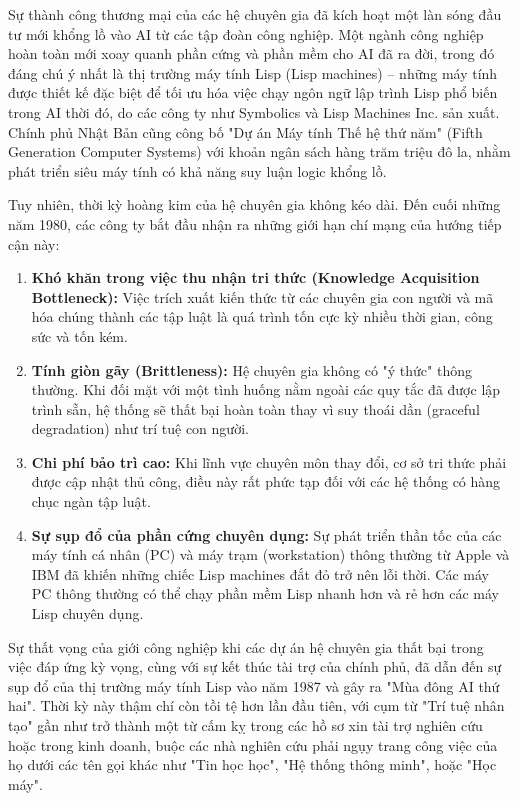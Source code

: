 \documentclass[12pt,a4paper]{article}
\begin{document}
Sự thành công thương mại của các hệ chuyên gia đã kích hoạt một làn sóng đầu tư mới khổng lồ vào AI từ các tập đoàn công nghiệp. Một ngành công nghiệp hoàn toàn mới xoay quanh phần cứng và phần mềm cho AI đã ra đời, trong đó đáng chú ý nhất là thị trường máy tính Lisp (Lisp machines) – những máy tính được thiết kế đặc biệt để tối ưu hóa việc chạy ngôn ngữ lập trình Lisp phổ biến trong AI thời đó, do các công ty như Symbolics và Lisp Machines Inc. sản xuất. Chính phủ Nhật Bản cũng công bố "Dự án Máy tính Thế hệ thứ năm" (Fifth Generation Computer Systems) với khoản ngân sách hàng trăm triệu đô la, nhằm phát triển siêu máy tính có khả năng suy luận logic khổng lồ.

Tuy nhiên, thời kỳ hoàng kim của hệ chuyên gia không kéo dài. Đến cuối những năm 1980, các công ty bắt đầu nhận ra những giới hạn chí mạng của hướng tiếp cận này:
\begin{enumerate}
    \item \textbf{Khó khăn trong việc thu nhận tri thức (Knowledge Acquisition Bottleneck):} Việc trích xuất kiến thức từ các chuyên gia con người và mã hóa chúng thành các tập luật là quá trình tốn cực kỳ nhiều thời gian, công sức và tốn kém.
    \item \textbf{Tính giòn gãy (Brittleness):} Hệ chuyên gia không có "ý thức" thông thường. Khi đối mặt với một tình huống nằm ngoài các quy tắc đã được lập trình sẵn, hệ thống sẽ thất bại hoàn toàn thay vì suy thoái dần (graceful degradation) như trí tuệ con người.
    \item \textbf{Chi phí bảo trì cao:} Khi lĩnh vực chuyên môn thay đổi, cơ sở tri thức phải được cập nhật thủ công, điều này rất phức tạp đối với các hệ thống có hàng chục ngàn tập luật.
    \item \textbf{Sự sụp đổ của phần cứng chuyên dụng:} Sự phát triển thần tốc của các máy tính cá nhân (PC) và máy trạm (workstation) thông thường từ Apple và IBM đã khiến những chiếc Lisp machines đắt đỏ trở nên lỗi thời. Các máy PC thông thường có thể chạy phần mềm Lisp nhanh hơn và rẻ hơn các máy Lisp chuyên dụng.
\end{enumerate}

Sự thất vọng của giới công nghiệp khi các dự án hệ chuyên gia thất bại trong việc đáp ứng kỳ vọng, cùng với sự kết thúc tài trợ của chính phủ, đã dẫn đến sự sụp đổ của thị trường máy tính Lisp vào năm 1987 và gây ra "Mùa đông AI thứ hai". Thời kỳ này thậm chí còn tồi tệ hơn lần đầu tiên, với cụm từ "Trí tuệ nhân tạo" gần như trở thành một từ cấm kỵ trong các hồ sơ xin tài trợ nghiên cứu hoặc trong kinh doanh, buộc các nhà nghiên cứu phải ngụy trang công việc của họ dưới các tên gọi khác như "Tin học học", "Hệ thống thông minh", hoặc "Học máy".
\end{document}

